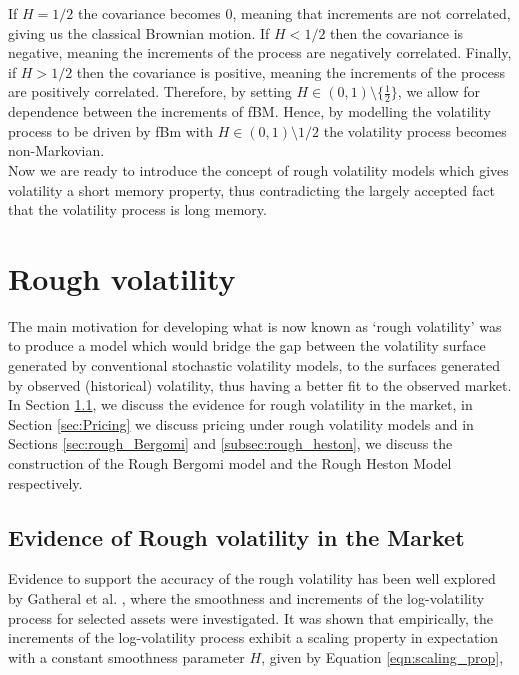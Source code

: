 \documentclass[12pt,oneside]{article}
\begin{document}
If $H=1/2$ the covariance becomes 0, meaning that increments are not correlated, giving us the classical Brownian motion. If $H<1/2$ then the covariance is negative, meaning the increments of the process are negatively correlated. Finally, if $H>1/2$ then the covariance is positive, meaning the increments of the process are positively correlated. Therefore, by setting $H\in(0,1)\setminus\{\frac{1}{2}\}$, we allow for dependence between the increments of fBM. Hence, by modelling the volatility process to be driven by fBm with $H\in(0,1)\setminus{1/2}$ the volatility process becomes non-Markovian.
\\

Now we are ready to introduce the concept of rough volatility models which gives volatility a short memory property, thus contradicting the largely accepted fact that the volatility process is long memory.

\section{Rough volatility}
\label{sec:rough_volatility}

The main motivation for developing what is now known as `rough volatility' was to produce a model which would bridge the gap between the volatility surface generated by conventional stochastic volatility models, to the surfaces generated by observed (historical) volatility, thus having a better fit to the observed market.
\\

In Section \ref{sec:rough_vol_evidence}, we discuss the evidence for rough volatility in the market, in Section \ref{sec:Pricing} we discuss pricing under rough volatility models and in Sections \ref{sec:rough_Bergomi} and \ref{subsec:rough_heston}, we discuss the construction of the Rough Bergomi model and the Rough Heston Model respectively. 

\subsection{Evidence of Rough volatility in the Market}
\label{sec:rough_vol_evidence}
 
Evidence to support the accuracy of the rough volatility  has been well explored by Gatheral et al. \cite{Gatheral2014}, where the smoothness and increments of the log-volatility process for selected assets were investigated. It was shown that empirically, the increments of the log-volatility process exhibit a scaling property in expectation with a constant smoothness parameter $H$, given by Equation \ref{eqn:scaling_prop}, 
\end{document}
